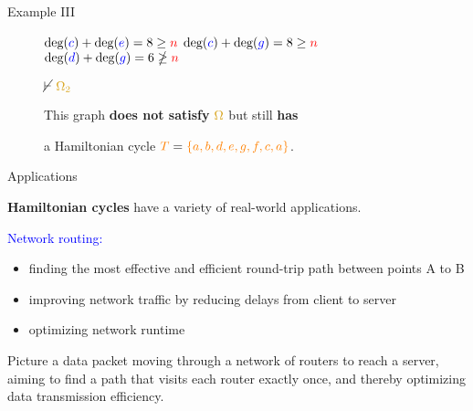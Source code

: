 \documentclass[pdf]{beamer}
\newcommand{\n}{\textcolor{red}{n}}
\newcommand{\T}{\textcolor{orange}{T}}
\newcommand{\bluec}{\textcolor{blue}{c}}
\newcommand{\blued}{\textcolor{blue}{d}}
\newcommand{\bluee}{\textcolor{blue}{e}}
\newcommand{\blueg}{\textcolor{blue}{g}}
\newcommand{\ore}{\textcolor{gold}{\Omega}}
\newcommand{\oresecondcond}{\textcolor{gold}{\Omega_2}}
\newcommand{\gdeg}{\text{deg}}
\begin{document}
\begin{frame}{Example III}
\begin{figure}
{            $\gdeg(\bluec) + \gdeg(\bluee) = 8 \geq \n$ \quad
            $\gdeg(\bluec) + \gdeg(\blueg) = 8 \geq \n$ \quad
            $\gdeg(\blued) + \gdeg(\blueg) = 6 \ngeq \n$}

            $\cancel\vdash \text{ } \oresecondcond$

            \pause

            \vspace{5px}

            This graph \textbf{does not satisfy} $\ore$ but still \textbf{has}
            
            a Hamiltonian cycle $\T = \textcolor{orange}{\{a,b,d,e,g,f,c,a\}}$.
        \end{figure}
    \end{frame}


    \begin{frame}{Applications}
   
        \textbf{Hamiltonian cycles} have a variety of real-world applications.

        \vspace{10px}

        \textcolor{blue}{Network routing:}
        \begin{itemize}
            \item finding the most effective and efficient round-trip path between points A to B
            \item improving network traffic by reducing delays from client to server
            \item optimizing network runtime
        \end{itemize}

        \vspace{20px}

        Picture a data packet moving through a network of routers to reach a server, aiming to find a path that visits each router exactly once, and thereby optimizing data transmission efficiency.

    \end{frame}
\end{document}
